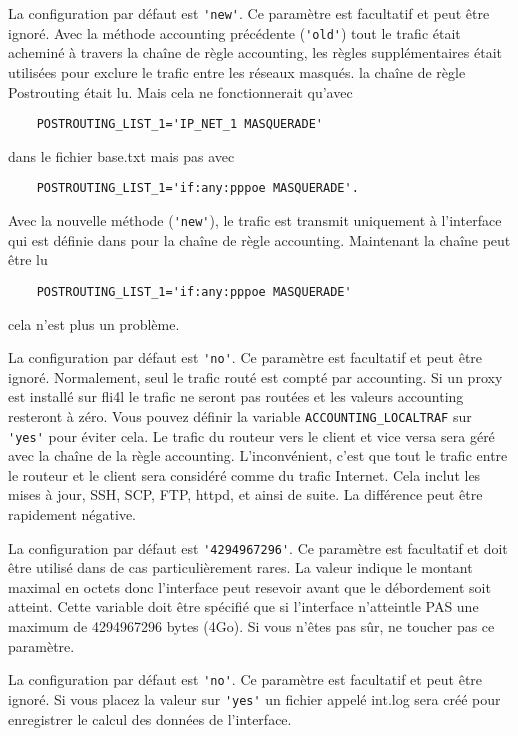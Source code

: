 \begin{description}
La configuration par défaut est \verb*?'new'?.
Ce paramètre est facultatif et peut être ignoré. Avec la méthode accounting
précédente (\verb*?'old'?) tout le trafic était acheminé à travers la chaîne
de règle accounting, les règles supplémentaires était utilisées pour exclure
le trafic entre les réseaux masqués. la chaîne de règle Postrouting était lu.
Mais cela ne fonctionnerait qu'avec
\begin{example}
\begin{verbatim}
    POSTROUTING_LIST_1='IP_NET_1 MASQUERADE'
\end{verbatim}
\end{example}
dans le fichier base.txt mais pas avec
\begin{example}
\begin{verbatim}
    POSTROUTING_LIST_1='if:any:pppoe MASQUERADE'.
\end{verbatim}
\end{example}
Avec la nouvelle méthode (\verb*?'new'?), le trafic est transmit uniquement à
l'interface qui est définie dans 
pour la chaîne de règle accounting. Maintenant la chaîne peut être lu
\begin{example}
\begin{verbatim}
    POSTROUTING_LIST_1='if:any:pppoe MASQUERADE'
\end{verbatim}
\end{example}
cela n'est plus un problème.

La configuration par défaut est \verb*?'no'?.
Ce paramètre est facultatif et peut être ignoré. Normalement, seul le trafic
routé est compté par accounting. Si un proxy est installé sur fli4l le trafic
ne seront pas routées et les valeurs accounting resteront à zéro. Vous pouvez
définir la variable \verb*?ACCOUNTING_LOCALTRAF? sur \verb*?'yes'? pour éviter
cela. Le trafic du routeur vers le client et vice versa sera géré avec la chaîne
de la règle accounting. L'inconvénient, c'est que tout le trafic entre le routeur
et le client sera considéré comme du trafic Internet. Cela inclut les mises à
jour, SSH, SCP, FTP, httpd, et ainsi de suite. La différence peut être
rapidement négative.

La configuration par défaut est \verb*?'4294967296'?.
Ce paramètre est facultatif et doit être utilisé dans de cas particulièrement
rares. La valeur indique le montant maximal en octets donc l'interface peut
resevoir avant que le débordement soit atteint. Cette variable doit être
spécifié que si l'interface n'atteintle PAS une maximum de 4294967296 bytes
(4Go). Si vous n'êtes pas sûr, ne toucher pas ce paramètre.

La configuration par défaut est \verb*?'no'?.
Ce paramètre est facultatif et peut être ignoré. Si vous placez la valeur sur
\verb*?'yes'? un fichier appelé int.log sera créé pour enregistrer le calcul
des données de l'interface.
\end{description}

